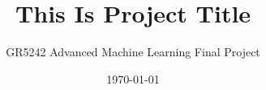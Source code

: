 \documentclass[letterpaper,12pt, oneside]{layout}
\title{This Is Project Title}
\subtitle{GR5242 Advanced Machine Learning Final Project}
\date{\today}
\begin{document}
\cleardoublepage
\maketitle

\frontmatter



\tableofcontents


\mainmatter





\appendix
\renewcommand\theequation{\Alph{chapter}--\arabic{equation}}
\renewcommand\thefigure{\Alph{chapter}--\arabic{figure}}
\renewcommand\thetable{\Alph{chapter}--\arabic{table}}




\backmatter



\end{document}
